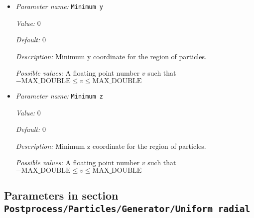 \begin{itemize}
{\it Default:} 0


{\it Description:} Minimum x coordinate for the region of particles.


{\it Possible values:} A floating point number $v$ such that $-\text{MAX\_DOUBLE} \leq v \leq \text{MAX\_DOUBLE}$
\item {\it Parameter name:} {\tt Minimum y}
\label{parameters:Postprocess/Particles/Generator/Uniform box/Minimum y}


{\it Value:} 0


{\it Default:} 0


{\it Description:} Minimum y coordinate for the region of particles.


{\it Possible values:} A floating point number $v$ such that $-\text{MAX\_DOUBLE} \leq v \leq \text{MAX\_DOUBLE}$
\item {\it Parameter name:} {\tt Minimum z}
\label{parameters:Postprocess/Particles/Generator/Uniform box/Minimum z}


{\it Value:} 0


{\it Default:} 0


{\it Description:} Minimum z coordinate for the region of particles.


{\it Possible values:} A floating point number $v$ such that $-\text{MAX\_DOUBLE} \leq v \leq \text{MAX\_DOUBLE}$
\end{itemize}

\subsection{Parameters in section \tt Postprocess/Particles/Generator/Uniform radial}
\label{parameters:Postprocess/Particles/Generator/Uniform_20radial}

